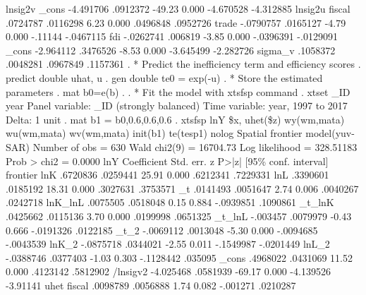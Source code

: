 lnsig2v      {\VBAR}
       _cons {\VBAR}  -4.491706   .0912372   -49.23   0.000    -4.670528   -4.312885
lnsig2u      {\VBAR}
      fiscal {\VBAR}   .0724787   .0116298     6.23   0.000     .0496848    .0952726
       trade {\VBAR}  -.0790757   .0165127    -4.79   0.000      -.11144   -.0467115
         fdi {\VBAR}  -.0262741    .006819    -3.85   0.000    -.0396391   -.0129091
       _cons {\VBAR}  -2.964112   .3476526    -8.53   0.000    -3.645499   -2.282726
     sigma_v {\VBAR}   .1058372   .0048281                      .0967849    .1157361
{\smallskip}
. * Predict the inefficiency term and efficiency scores
. predict double uhat, u
{\smallskip}
. gen double te0 = exp(-u) 
{\smallskip}
. * Store the estimated parameters
. mat b0=e(b)
{\smallskip}
. 
. * Fit the model with xtsfsp command
. xtset _ID year
{\smallskip}
Panel variable: _ID (strongly balanced)
 Time variable: year, 1997 to 2017
         Delta: 1 unit
{\smallskip}
. mat b1 = b0,0.6,0.6,0.6
{\smallskip}
. xtsfsp lnY \$x, uhet(\$z) wy(wm,mata) wu(wm,mata) wv(wm,mata) init(b1) te(tesp1) nolog 
{\smallskip}
Spatial frontier model(yuv-SAR)                       Number of obs =      630
                                                      Wald chi2(9)  = 16704.73
Log likelihood = 328.51183                            Prob > chi2   =   0.0000
{\smallskip}
         lnY {\VBAR} Coefficient  Std. err.      z    P>|z|     [95\% conf. interval]
frontier     {\VBAR}
         lnK {\VBAR}   .6720836   .0259441    25.91   0.000     .6212341    .7229331
         lnL {\VBAR}   .3390601   .0185192    18.31   0.000     .3027631    .3753571
          _t {\VBAR}   .0141493   .0051647     2.74   0.006     .0040267    .0242718
     lnK_lnL {\VBAR}   .0075505   .0518048     0.15   0.884    -.0939851    .1090861
      _t_lnK {\VBAR}   .0425662   .0115136     3.70   0.000     .0199998    .0651325
      _t_lnL {\VBAR}   -.003457   .0079979    -0.43   0.666    -.0191326    .0122185
        _t_2 {\VBAR}  -.0069112   .0013048    -5.30   0.000    -.0094685   -.0043539
       lnK_2 {\VBAR}  -.0875718   .0344021    -2.55   0.011    -.1549987   -.0201449
       lnL_2 {\VBAR}  -.0388746   .0377403    -1.03   0.303    -.1128442     .035095
       _cons {\VBAR}   .4968022   .0431069    11.52   0.000     .4123142    .5812902
    /lnsigv2 {\VBAR}  -4.025468   .0581939   -69.17   0.000    -4.139526    -3.91141
uhet         {\VBAR}
      fiscal {\VBAR}   .0098789   .0056888     1.74   0.082     -.001271    .0210287
